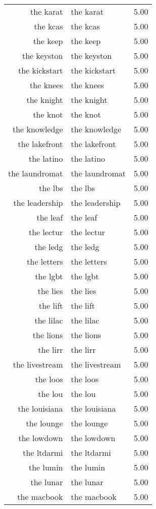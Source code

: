 \begin{table}[ht]
\begin{tabular}{rlr}
  the karat & the karat & 5.00 \\ 
  the kcas & the kcas & 5.00 \\ 
  the keep & the keep & 5.00 \\ 
  the keyston & the keyston & 5.00 \\ 
  the kickstart & the kickstart & 5.00 \\ 
  the knees & the knees & 5.00 \\ 
  the knight & the knight & 5.00 \\ 
  the knot & the knot & 5.00 \\ 
  the knowledge & the knowledge & 5.00 \\ 
  the lakefront & the lakefront & 5.00 \\ 
  the latino & the latino & 5.00 \\ 
  the laundromat & the laundromat & 5.00 \\ 
  the lbs & the lbs & 5.00 \\ 
  the leadership & the leadership & 5.00 \\ 
  the leaf & the leaf & 5.00 \\ 
  the lectur & the lectur & 5.00 \\ 
  the ledg & the ledg & 5.00 \\ 
  the letters & the letters & 5.00 \\ 
  the lgbt & the lgbt & 5.00 \\ 
  the lies & the lies & 5.00 \\ 
  the lift & the lift & 5.00 \\ 
  the lilac & the lilac & 5.00 \\ 
  the lions & the lions & 5.00 \\ 
  the lirr & the lirr & 5.00 \\ 
  the livestream & the livestream & 5.00 \\ 
  the loos & the loos & 5.00 \\ 
  the lou & the lou & 5.00 \\ 
  the louisiana & the louisiana & 5.00 \\ 
  the lounge & the lounge & 5.00 \\ 
  the lowdown & the lowdown & 5.00 \\ 
  the ltdarmi & the ltdarmi & 5.00 \\ 
  the lumin & the lumin & 5.00 \\ 
  the lunar & the lunar & 5.00 \\ 
  the macbook & the macbook & 5.00 \\ 

\end{tabular}
\end{table}
